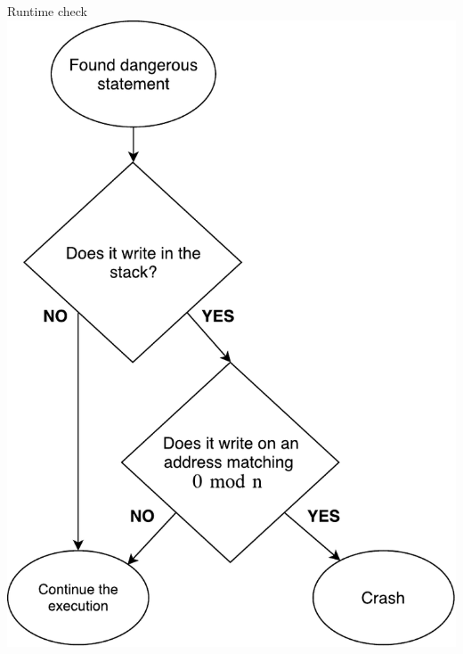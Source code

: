 \documentclass{beamer}
\begin{document}
\begin{frame}[c]{Runtime check}
	\vspace{-8mm}
	\hspace{30mm}
   	\includegraphics[height=0.95\textheight]{images/runtime_check.pdf}
\end{frame}
\end{document}
